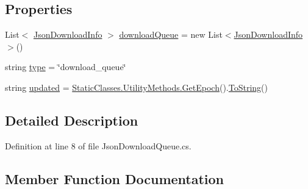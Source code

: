 \subsection*{Properties}
\begin{DoxyCompactItemize}
\item 
List$<$ \mbox{\hyperlink{class_little_weeb_library_1_1_models_1_1_json_download_info}{Json\+Download\+Info}} $>$ \mbox{\hyperlink{class_little_weeb_library_1_1_models_1_1_json_download_queue_adedf9349c2afaa8562acc771e4fe5829}{download\+Queue}} = new List$<$\mbox{\hyperlink{class_little_weeb_library_1_1_models_1_1_json_download_info}{Json\+Download\+Info}}$>$()
\item 
string \mbox{\hyperlink{class_little_weeb_library_1_1_models_1_1_json_download_queue_ae1c18d45b790f6d9eb3e7f80881a5717}{type}} = \char`\"{}download\+\_\+queue\char`\"{}
\item 
string \mbox{\hyperlink{class_little_weeb_library_1_1_models_1_1_json_download_queue_a3c74cd3356056030ff71af3892d10b03}{updated}} = \mbox{\hyperlink{class_little_weeb_library_1_1_static_classes_1_1_utility_methods_a12336d9e64983ddabaad8950486fafb2}{Static\+Classes.\+Utility\+Methods.\+Get\+Epoch}}().\mbox{\hyperlink{class_little_weeb_library_1_1_models_1_1_json_download_queue_a0613fd2171f103708bdc981048f3b80c}{To\+String}}()
\end{DoxyCompactItemize}


\subsection{Detailed Description}


Definition at line 8 of file Json\+Download\+Queue.\+cs.



\subsection{Member Function Documentation}
\mbox{\label{class_little_weeb_library_1_1_models_1_1_json_download_queue_a0cf0692da69b7c4ab44b7983db377c64}} 

